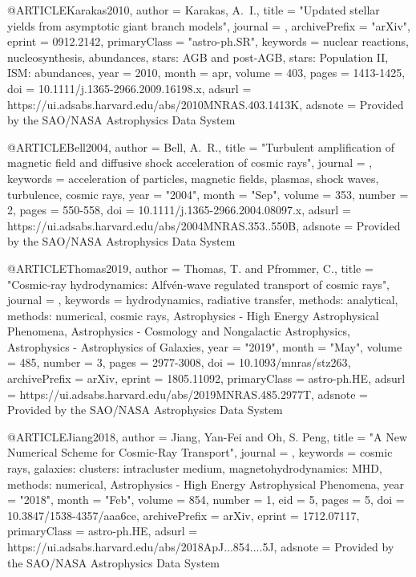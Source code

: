 \documentclass[useAMS,usenatbib]{mnras}
\begin{document}
{{{{{@ARTICLE{Karakas2010,
   author = {{Karakas}, A.~I.},
    title = "{Updated stellar yields from asymptotic giant branch models}",
  journal = {\mnras},
archivePrefix = "arXiv",
   eprint = {0912.2142},
 primaryClass = "astro-ph.SR",
 keywords = {nuclear reactions, nucleosynthesis, abundances, stars: AGB and post-AGB, stars: Population II, ISM: abundances},
     year = 2010,
    month = apr,
   volume = 403,
    pages = {1413-1425},
      doi = {10.1111/j.1365-2966.2009.16198.x},
   adsurl = {https://ui.adsabs.harvard.edu/abs/2010MNRAS.403.1413K},
  adsnote = {Provided by the SAO/NASA Astrophysics Data System}
}

@ARTICLE{Bell2004,
       author = {{Bell}, A.~R.},
        title = "{Turbulent amplification of magnetic field and diffusive shock acceleration of cosmic rays}",
      journal = {\mnras},
     keywords = {acceleration of particles, magnetic fields, plasmas, shock waves, turbulence, cosmic rays},
         year = "2004",
        month = "Sep",
       volume = {353},
       number = {2},
        pages = {550-558},
          doi = {10.1111/j.1365-2966.2004.08097.x},
       adsurl = {https://ui.adsabs.harvard.edu/abs/2004MNRAS.353..550B},
      adsnote = {Provided by the SAO/NASA Astrophysics Data System}
}

@ARTICLE{Thomas2019,
       author = {{Thomas}, T. and {Pfrommer}, C.},
        title = "{Cosmic-ray hydrodynamics: Alfv{\'e}n-wave regulated transport of cosmic rays}",
      journal = {\mnras},
     keywords = {hydrodynamics, radiative transfer, methods: analytical, methods: numerical, cosmic rays, Astrophysics - High Energy Astrophysical Phenomena, Astrophysics - Cosmology and Nongalactic Astrophysics, Astrophysics - Astrophysics of Galaxies},
         year = "2019",
        month = "May",
       volume = {485},
       number = {3},
        pages = {2977-3008},
          doi = {10.1093/mnras/stz263},
archivePrefix = {arXiv},
       eprint = {1805.11092},
 primaryClass = {astro-ph.HE},
       adsurl = {https://ui.adsabs.harvard.edu/abs/2019MNRAS.485.2977T},
      adsnote = {Provided by the SAO/NASA Astrophysics Data System}
}

@ARTICLE{Jiang2018,
       author = {{Jiang}, Yan-Fei and {Oh}, S. Peng},
        title = "{A New Numerical Scheme for Cosmic-Ray Transport}",
      journal = {\apj},
     keywords = {cosmic rays, galaxies: clusters: intracluster medium, magnetohydrodynamics: MHD, methods: numerical, Astrophysics - High Energy Astrophysical Phenomena},
         year = "2018",
        month = "Feb",
       volume = {854},
       number = {1},
          eid = {5},
        pages = {5},
          doi = {10.3847/1538-4357/aaa6ce},
archivePrefix = {arXiv},
       eprint = {1712.07117},
 primaryClass = {astro-ph.HE},
       adsurl = {https://ui.adsabs.harvard.edu/abs/2018ApJ...854....5J},
      adsnote = {Provided by the SAO/NASA Astrophysics Data System}
}

}}}}}
\end{document}
